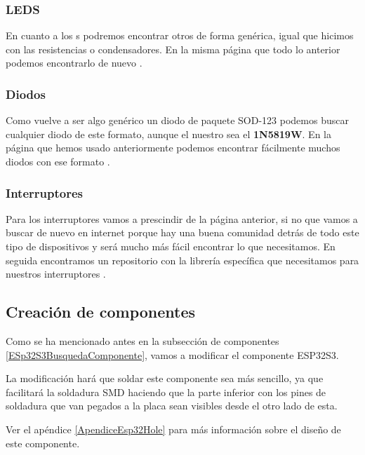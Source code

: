 \subsubsection{\gls{LED}S}

En cuanto a los s podremos encontrar otros de forma genérica, igual que hicimos con las resistencias o condensadores. En la misma página que todo lo anterior podemos encontrarlo de nuevo \cite{SnapedaWS2812B}.

\subsubsection{Diodos}

Como vuelve a ser algo genérico un diodo de paquete SOD-123 podemos buscar cualquier diodo de este formato, aunque el nuestro sea el \textbf{1N5819W}. En la página que hemos usado anteriormente podemos encontrar fácilmente muchos diodos con ese formato \cite{Snapeda1N5819W}.

\subsubsection{Interruptores}

Para los interruptores vamos a prescindir de la página anterior, si no que vamos a buscar de nuevo en internet porque hay una buena comunidad detrás de todo este tipo de dispositivos y será mucho más fácil encontrar lo que necesitamos. En seguida encontramos un repositorio con la librería específica que necesitamos para nuestros interruptores \cite{GitInterruptores}.

\subsection{Creación de componentes}

Como se ha mencionado antes en la subsección de componentes \ref{ESp32S3BusquedaComponente}, vamos a modificar el componente ESP32S3.

La modificación hará que soldar este componente sea más sencillo, ya que facilitará la soldadura \gls{SMD} haciendo que la parte inferior con los pines de soldadura que van pegados a la placa sean visibles desde el otro lado de esta.

\begin{tcolorbox}[colback=blue!5!white, colframe=blue!55!white, title=Nota]
    Ver el apéndice \ref{ApendiceEsp32Hole} para más información sobre el diseño de este componente.
\end{tcolorbox}

